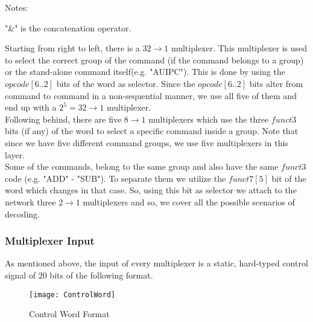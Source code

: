 \begin{threeparttable}[h!]
 		\begin{tablenotes}
 		\footnotesize
 		\item 
 		Notes:
 		\item 	
 		"\&" is the concatenation operator.
 		\end{tablenotes}
 		
 		\label{subsec3.2:table3.1}
 		\vspace{5mm}
 		
 	\end{threeparttable}
 
 	\clearpage
	 	 
	 Starting from right to left, there is a $32\rightarrow1$ multiplexer. This multiplexer is used to select the correct group of the command (if the command belongs to a group) or the stand-alone command itself(e.g. "AUIPC"). This is done by using the $opcode[6..2]$ bits of the word as selector. Since the $opcode[6..2]$ bits alter from command to command in a non-sequential manner, we use all five of them and end up with a $2^{5}=32\rightarrow1$ multiplexer.\\
	 
	 Following behind, there are five $8\rightarrow1$ multiplexers which use the three $funct3$ bits (if any) of the word to select a specific command inside a group. Note that since we have five different command groups, we use five multiplexers in this layer.\\
	 
	 Some of the commands, belong to the same group and also have the same $funct3$ code (e.g. "ADD" - "SUB"). To separate them we utilize the $funct7[5]$ bit of the word which changes in that case. So, using this bit as selector we attach to the network three $2\rightarrow1$ multiplexers and so, we cover all the possible scenarios of decoding.\\
	 
	
	\subsubsection{Multiplexer Input}
	\label{subsub:muxin}
	
	As mentioned above, the input of every multiplexer is a static, hard-typed control signal of $20$ bits of the following format. \\
	
	\begin{figure}[h!]
		\begin{center}
			\texttt{[image: ControlWord]}
			\caption{Control Word Format}
			\label{Image3.3}
		\end{center}
	\end{figure}	

